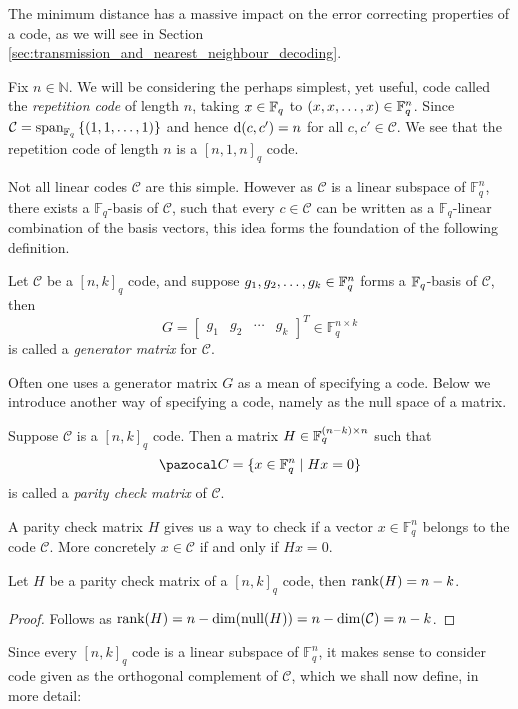 The minimum distance has a massive impact on the error correcting properties of a code, as we will see in Section \ref{sec:transmission_and_nearest_neighbour_decoding}.

\begin{example}\label{exmp:repetition_code}
  Fix $n \in \mathbb{N}$. We will be considering the perhaps simplest, yet useful, code called the \textit{repetition code} of length $n$, taking $x \in \mathbb{F}_{q}$ to $(x, x, \ldots, x) \in \mathbb{F}_{q}^{n}$. Since $\mathcal{C} = \textnormal{span}_{\mathbb{F}_{q}}\left\{(1,1, \ldots, 1)\right\}$ and hence $\mathrm{d}(c, c') = n$ for all $c, c' \in \mathcal{C}$. We see that the repetition code of length $n$ is a $[n, 1, n]_{q}$ code.
\end{example}
Not all linear codes $\mathcal{C}$ are this simple. However as $\mathcal{C}$ is a linear subspace of $\mathbb{F}_q^{n}$, there exists a $\mathbb{F}_q$-basis of $\mathcal{C}$, such that every $c \in \mathcal{C}$ can be written as a $\mathbb{F}_q$-linear combination of the basis vectors, this idea forms the foundation of the following definition.

\begin{definition}
  Let $\mathcal{C}$ be a $[n, k]_{q}$ code, and suppose $g_{1}, g_{2}, \ldots, g_{k} \in \mathbb{F}_{q}^{n}$ forms a $\mathbb{F}_{q}$-basis of $\mathcal{C}$, then
  \begin{equation*}
    G = \begin{bmatrix} g_{1} & g_{2} & \cdots & g_{k} \end{bmatrix}^{T} \in \mathbb{F}^{n \times k}_{q}
  \end{equation*}
  is called a \textit{generator matrix} for $\mathcal{C}$.
\end{definition}
Often one uses a generator matrix $G$ as a mean of specifying a code. Below we introduce another way of specifying a code, namely as the null space of a matrix.
\begin{definition}
  Suppose $\mathcal{C}$ is a $[n, k]_q$ code. Then a matrix $H \in \mathbb{F}_{q}^{(n-k) \times n}$ such that
  \begin{equation*}
    \C = \{x \in \F_{q}^{n} \;\vert\; Hx = 0\}
  \end{equation*}
  is called a \textit{parity check matrix} of $\mathcal{C}$.
\end{definition}
A parity check matrix $H$ gives us a way to check if a vector $x \in \mathbb{F}_q^n$ belongs to the code $\mathcal{C}$. More concretely $x \in \mathcal{C}$ if and only if $Hx = 0$.

\begin{lemma}\label{lem:H_has_rank_n-k}
  Let $H$ be a parity check matrix of a $[n,k]_{q}$ code, then $\textnormal{rank}(H) = n - k$.
\end{lemma}
\begin{proof} %
  Follows as $\textnormal{rank}(H) = n - \dim(\textnormal{null}(H)) = n - \dim(\mathcal{C}) = n - k$.
\end{proof}
Since every $[n, k]_{q}$ code is a linear subspace of $\mathbb{F}_{q}^{n}$, it makes sense to consider code given as the orthogonal complement of $\mathcal{C}$, which we shall now define, in more detail:

